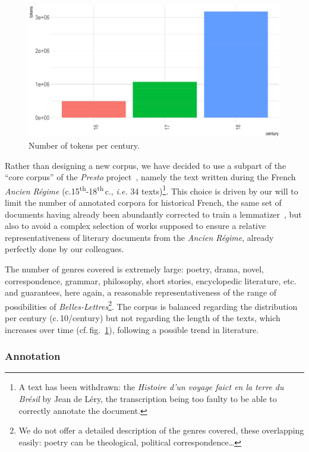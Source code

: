 \begin{figure}[!htp]
    \centering
    \includegraphics[width=0.6\linewidth]{static/media/mod_eval/dalembert/distribution_tokens_corpus.png}
    \caption{Number of tokens per century.}
    \label{fig:description}
\end{figure}

Rather than designing a new corpus, we have decided to use a subpart of the ``core corpus'' of the \textit{Presto} project~\cite{blumenthal-etal-2017-presto}, namely the text written during the French \textit{Ancien Régime} (c.15\textsuperscript{th}-18\textsuperscript{th}\,c., \textit{i.e.} 34 texts)\footnote{A text has been withdrawn: the \textit{Histoire d'un voyage faict en la terre du Brésil} by Jean de Léry, the transcription being too faulty to be able to correctly annotate the document.}. This choice is driven by our will to limit the number of annotated corpora for historical French, the same set of documents having already been abundantly corrected to train a lemmatizer~\cite{gabay-etal-2020-standardizing}, but also to avoid a complex selection of works supposed to ensure a relative representativeness of literary documents from the \textit{Ancien Régime}, already perfectly done by our colleagues.

The number of genres covered is extremely large: poetry, drama, novel, correspondence, grammar, philosophy, short stories, encyclopedic literature, etc. and guarantees, here again, a reasonable representativeness of the range of possibilities of \textit{Belles-Lettres}\footnote{We do not offer a detailed description of the genres covered, these overlapping easily: poetry can be theological, political correspondence\dots}. The corpus is balanced regarding the distribution per century (c.\,10/century) but not regarding the length of the texts, which increases over time (cf.\,fig.~\ref{fig:description}), following a possible trend in literature.

\subsubsection{Annotation}

